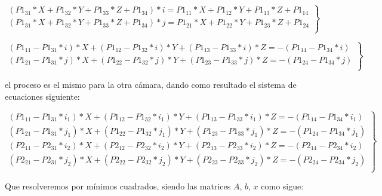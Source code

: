 \documentclass[paper=a4, fontsize=11pt]{scrartcl} %
\numberwithin{equation}{section} %
\numberwithin{figure}{section} %
\numberwithin{table}{section} %
\begin{document}
\begin{equation}
	\left.
	\begin{array}{l}
		(P1_{31}*X + P1_{32}*Y + P1_{33}*Z + P1_{34})*i = P1_{11}*X + P1_{12}*Y + P1_{13}*Z + P1_{14} \\
		(P1_{31}*X + P1_{32}*Y + P1_{33}*Z + P1_{34})*j = P1_{21}*X + P1_{22}*Y + P1_{23}*Z + P1_{24} \\
	\end{array}
	\right\rbrace
\end{equation} 

\begin{equation}
	\left.
	\begin{array}{l}
		(P1_{11} - P1_{31}*i)*X + (P1_{12} - P1_{32}*i)*Y + (P1_{13} - P1_{33}*i)*Z = -(P1_{14} - P1_{34}*i) \\
		(P1_{21} - P1_{31}*j)*X + (P1_{22} - P1_{32}*j)*Y + (P1_{23} - P1_{33}*j)*Z = -(P1_{24} - P1_{34}*j) \\
	\end{array}
	\right\rbrace
\end{equation} 

el proceso es el mismo para la otra cámara, dando como resultado el sistema de ecuaciones siguiente:

\begin{equation}
	\left.
	\begin{array}{l}
		(P1_{11} - P1_{31}*i_1)*X + (P1_{12} - P1_{32}*i_1)*Y + (P1_{13} - P1_{33}*i_1)*Z = -(P1_{14} - P1_{34}*i_1) \\
		(P1_{21} - P1_{31}*j_1)*X + (P1_{22} - P1_{32}*j_1)*Y + (P1_{23} - P1_{33}*j_1)*Z = -(P1_{24} - P1_{34}*j_1) \\
		(P2_{11} - P2_{31}*i_2)*X + (P2_{12} - P2_{32}*i_2)*Y + (P2_{13} - P2_{33}*i_2)*Z = -(P2_{14} - P2_{34}*i_2) \\
		(P2_{21} - P2_{31}*j_2)*X + (P2_{22} - P2_{32}*j_2)*Y + (P2_{23} - P2_{33}*j_2)*Z = -(P2_{24} - P2_{34}*j_2) \\
	\end{array}
	\right\rbrace
\end{equation} 

Que resolveremos por mínimos cuadrados, siendo las matrices $A$,  $b$, $x$ como sigue:
\end{document}
